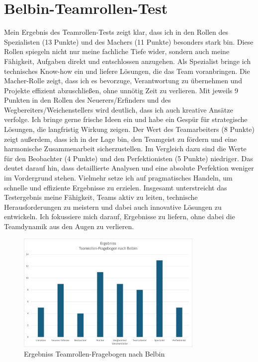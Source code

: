 \grqq\section{Belbin-Teamrollen-Test}
Mein Ergebnis des Teamrollen-Tests zeigt klar, dass ich in den Rollen des Spezialisten (13 Punkte) und des Machers (11 Punkte) besonders stark bin. Diese Rollen spiegeln nicht nur meine fachliche Tiefe wider, sondern auch meine Fähigkeit, Aufgaben direkt und entschlossen anzugehen. Als Spezialist bringe ich technisches Know-how ein und liefere Lösungen, die das Team voranbringen. Die Macher-Rolle zeigt, dass ich es bevorzuge, Verantwortung zu übernehmen und Projekte effizient abzuschließen, ohne unnötig Zeit zu verlieren.
Mit jeweils 9 Punkten in den Rollen des Neuerers/Erfinders und des Wegbereiters/Weichenstellers wird deutlich, dass ich auch kreative Ansätze verfolge. Ich bringe gerne frische Ideen ein und habe ein Gespür für strategische Lösungen, die langfristig Wirkung zeigen. Der Wert des Teamarbeiters (8 Punkte) zeigt außerdem, dass ich in der Lage bin, den Teamgeist zu fördern und eine harmonische Zusammenarbeit sicherzustellen.
Im Vergleich dazu sind die Werte für den Beobachter (4 Punkte) und den Perfektionisten (5 Punkte) niedriger. Das deutet darauf hin, dass detaillierte Analysen und eine absolute Perfektion weniger im Vordergrund stehen. Vielmehr setze ich auf pragmatisches Handeln, um schnelle und effiziente Ergebnisse zu erzielen.
Insgesamt unterstreicht das Testergebnis meine Fähigkeit, Teams aktiv zu leiten, technische Herausforderungen zu meistern und dabei auch innovative Lösungen zu entwickeln. Ich fokussiere mich darauf, Ergebnisse zu liefern, ohne dabei die Teamdynamik aus den Augen zu verlieren.

\begin{figure}[H]
	\begin{center}
		\includegraphics[width=0.8\textwidth]{Pictures/ErgebnisBelbin.png}
    \end{center}
	\caption[Ergebniss Teamrollen-Fragebogen nach Belbin]{Ergebniss Teamrollen-Fragebogen nach Belbin}
	\label{fig:ErgebnisBelbin}
\end{figure}

\newpage
